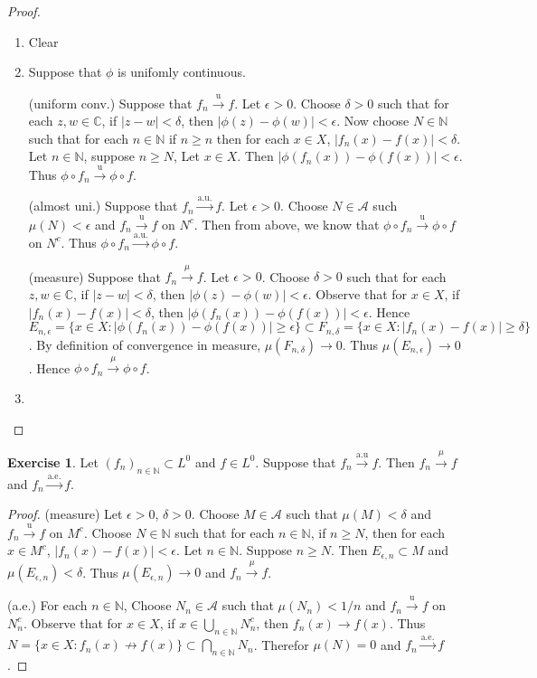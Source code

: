 \documentclass[12pt]{amsart}
\theoremstyle{definition}
\newtheorem{ex}[definition]{Exercise}
\newcommand{\del}{\delta}
\newcommand{\ep}{\epsilon}
\newcommand{\C}{\mathbb{C}}
\newcommand{\N}{\mathbb{N}}
\newcommand{\MA}{\mathcal{A}}
\newcommand{\convt}[1]{\xrightarrow{\text{#1}}}
\newcommand{\conv}[1]{\xrightarrow{#1}}
\newcommand{\lex}[1]{\label{ex:#1}}
\begin{document}
	\begin{proof}
		\begin{enumerate}
			\item Clear
			\item Suppose that $\phi$ is unifomly continuous. 
			
			(uniform conv.) Suppose that $f_n \convt{u} f$. Let $\ep > 0$. Choose $\del >0$ such that for each $z,w \in \C$, if $|z-w|<\del$, then $|\phi(z) - \phi(w)| < \ep$. Now choose $N \in \N$ such that for each $n \in \N$ if $n \geq n$ then for each $x \in X$, $|f_n(x)-f(x)| < \del$. Let $n \in \N$, suppose $n \geq N$, Let $x \in X$. Then $|\phi(f_n(x)) - \phi(f(x))| < \ep$. Thus $\phi \circ f_n \convt{u} \phi \circ f$.
			
			(almost uni.) Suppose that $f_n \convt{a.u.} f$. Let $\ep > 0$. Choose $N \in \MA$ such $\mu(N) < \ep$ and $f_n \convt{u} f$ on $N^c$. Then from above, we know that $\phi \circ f_n \convt{u} \phi \circ f$ on $N^c$. Thus $\phi \circ f_n \convt{a.u.} \phi \circ f$.
			
			(measure) Suppose that $f_n \conv{\mu} f$. Let $\ep > 0$. Choose $\del >0$ such that for each $z,w \in \C$, if $|z-w|<\del$, then $|\phi(z) - \phi(w)| < \ep$. Observe that for $x \in X$, if $|f_n(x) - f(x)| < \del$, then $|\phi(f_n(x)) - \phi(f(x))| < \ep$. Hence $E_{n,\ep} = \{x \in X: |\phi(f_n(x)) - \phi(f(x))| \geq \ep\} \subset F_{n,\del} = \{x \in X: |f_n(x) - f(x)| \geq \del\}$. By definition of convergence in measure, $\mu(F_{n,\del}) \rightarrow 0$. Thus $\mu(E_{n,\ep}) \rightarrow 0$. Hence $\phi \circ f_n \conv{\mu} \phi \circ f$.
			
			\item
		\end{enumerate}
	\end{proof}
	
	\begin{ex} \lex{35011} 
		Let $(f_n)_{n \in \N} \subset L^0$ and $f \in L^0$. Suppose that $f_n \convt{a.u} f$. Then $f_n \conv{\mu}f$ and $f_n \convt{a.e.}f$. 
	\end{ex}
	
	\begin{proof}
		(measure) Let $\ep>0$, $\del >0$. Choose $M \in \MA$ such that $\mu(M) < \del$ and $f_n \convt{u} f$ on $M^c$. Choose $N \in \N$ such that for each $n \in \N$, if $n \geq N$, then for each $x \in M^c$, $|f_n(x) - f(x)| < \ep$. Let $n \in \N$. Suppose $n \geq N$. Then $E_{\ep,n} \subset M$ and $\mu(E_{\ep,n}) < \del$. Thus $\mu(E_{\ep,n}) \rightarrow 0$ and $f_n \conv{\mu} f$.
		
		(a.e.) For each $n \in \N$, Choose $N_n \in \MA$ such that $\mu(N_n) < 1/n$ and $f_n \convt{u} f$ on $N_n^c$. Observe that for $x \in X$, if $x \in \bigcup_{n \in \N}N_n^c$, then $f_n(x) \rightarrow f(x)$. Thus $N = \{x \in X: f_n(x) \not \rightarrow f(x)\} \subset \bigcap_{n \in \N} N_n$. Therefor $\mu(N) = 0$ and $f_n \convt{a.e.} f$.
	\end{proof}
	
\end{document}
